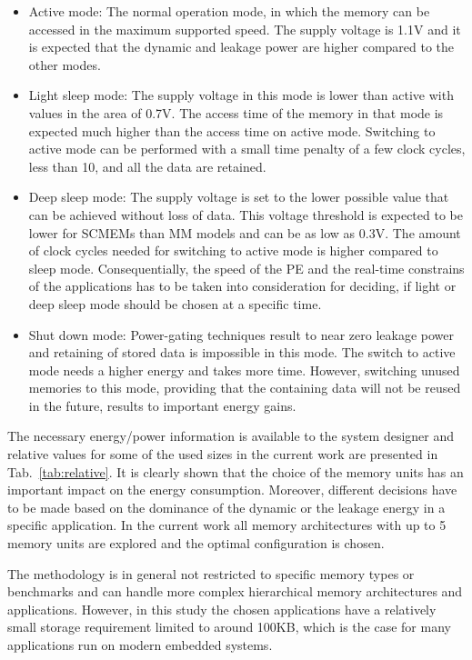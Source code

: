 \documentclass[a4paper,conference]{IEEEtran}
\begin{document}
\begin{itemize}
\item Active mode: The normal operation mode, in which the memory can be accessed in the maximum supported speed. The supply voltage is 1.1V and it is expected that the dynamic and leakage power are higher compared to the other modes.
\item Light sleep mode: The supply voltage in this mode is lower than active with values in the area of 0.7V. The access time of the memory in that mode is expected much higher than the access time on active mode. Switching to active mode can be performed with a small time penalty of a few clock cycles, less than 10, and all the data are retained.  
\item Deep sleep mode: The supply voltage is set to the lower possible value that can be achieved without loss of data. This voltage threshold is expected to be lower for SCMEMs than MM models and can be as low as 0.3V. The amount of clock cycles needed for switching to active mode is higher compared to sleep mode. Consequentially, the speed of the PE and the real-time constrains of the applications has to be taken into consideration for deciding, if light or deep sleep mode should be chosen at a specific time.  
\item Shut down mode: Power-gating techniques result to near zero leakage power and retaining of stored data is impossible in this mode. The switch to active mode needs a higher energy and takes more time. However, switching unused memories to this mode, providing that the containing data will not be reused in the future, results to important energy gains.
\end{itemize}  

The necessary energy/power information is available to the system designer and relative values for some of the used sizes in the current work are presented in Tab.~\ref{tab:relative}. It is clearly shown that the choice of the memory units has an important impact on the energy consumption. Moreover, different decisions have to be made based on the dominance of the dynamic or the leakage energy in a specific application. In the current work all memory architectures with up to 5 memory units are explored and the optimal configuration is chosen.

The methodology is in general not restricted to specific memory types or benchmarks and can handle more complex hierarchical memory architectures and applications. However, in this study the chosen applications have a relatively small storage requirement limited to around 100KB, which is the case for many applications run on modern embedded systems. 
\end{document}
